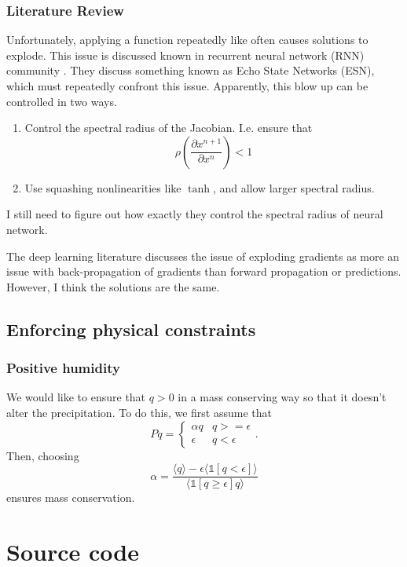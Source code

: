 \documentclass{report}
\newcommand{\1}[1]{\mathds{1}\left[#1\right]}
\begin{document}
\subsection{Literature Review}
\label{sec:blowup-rnn}


Unfortunately, applying a function repeatedly like often causes solutions to
explode. 
This issue is discussed known in recurrent neural network (RNN) community
\autocite[See Ch. 
10.7]{Goodfellow2016}.
They discuss something known as Echo State Networks (ESN), which must repeatedly
confront this issue. Apparently, this blow up can be controlled in two ways.
\begin{enumerate}
\item Control the spectral radius of the Jacobian. I.e. ensure that
  \[\rho \left( \frac{\partial x^{n+1}}{\partial x^n} \right) < 1\]
  
\item Use squashing nonlinearities like $\tanh$, and allow larger spectral radius.
\end{enumerate}

I still need to figure out how exactly they control the spectral radius of
neural network.

The deep learning literature discusses the issue of exploding gradients as more
an issue with back-propagation of gradients than forward propagation or
predictions. However, I think the solutions are the same.


\section{Enforcing physical constraints}

\subsection{Positive humidity}

We would like to ensure that $q> 0$ in a mass conserving way so that it doesn't alter the precipitation.
To do this, we first assume that
\[ Pq =
  \begin{cases}
    \alpha q & q >= \epsilon \\
    \epsilon & q < \epsilon
  \end{cases}.
\]
Then, choosing
\[\alpha = \frac{\langle q \rangle - \epsilon \langle \1{q < \epsilon} \rangle}{\langle \1{q \geq \epsilon} q \rangle}\]
ensures mass conservation.


\printbibliography
\appendix

\chapter{Source code}
\label{sec:source}

% 
\end{document}
